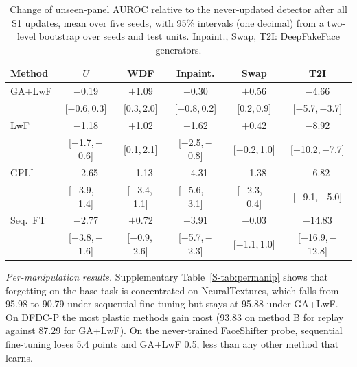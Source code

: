 \documentclass[journal]{IEEEtran}
\begin{document}
\begin{table}[t]
\caption{Change of unseen-panel AUROC relative to the never-updated detector after all S1 updates, mean over five seeds, with 95\% intervals (one decimal) from a two-level bootstrap over seeds and test units. Inpaint., Swap, T2I: DeepFakeFace generators.}
\label{tab:retention}
\centering
\footnotesize
\setlength{\tabcolsep}{0.9pt}
\begin{tabular}{@{}lccccc@{}}
\toprule
Method & $U$ & WDF & Inpaint. & Swap & T2I \\
\midrule
GA+LwF & $-$0.19 & $+$1.09 & $-$0.30 & $+$0.56 & $-$4.66 \\
 & {\scriptsize[$-$0.6,\,0.3]} & {\scriptsize[0.3,\,2.0]} & {\scriptsize[$-$0.8,\,0.2]} & {\scriptsize[0.2,\,0.9]} & {\scriptsize[$-$5.7,\,$-$3.7]} \\[1pt]
LwF & $-$1.18 & $+$1.02 & $-$1.62 & $+$0.42 & $-$8.92 \\
 & {\scriptsize[$-$1.7,\,$-$0.6]} & {\scriptsize[0.1,\,2.1]} & {\scriptsize[$-$2.5,\,$-$0.8]} & {\scriptsize[$-$0.2,\,1.0]} & {\scriptsize[$-$10.2,\,$-$7.7]} \\[1pt]
GPL$^\dagger$ & $-$2.65 & $-$1.13 & $-$4.31 & $-$1.38 & $-$6.82 \\
 & {\scriptsize[$-$3.9,\,$-$1.4]} & {\scriptsize[$-$3.4,\,1.1]} & {\scriptsize[$-$5.6,\,$-$3.1]} & {\scriptsize[$-$2.3,\,$-$0.4]} & {\scriptsize[$-$9.1,\,$-$5.0]} \\[1pt]
Seq.\ FT & $-$2.77 & $+$0.72 & $-$3.91 & $-$0.03 & $-$14.83 \\
 & {\scriptsize[$-$3.8,\,$-$1.6]} & {\scriptsize[$-$0.9,\,2.6]} & {\scriptsize[$-$5.7,\,$-$2.3]} & {\scriptsize[$-$1.1,\,1.0]} & {\scriptsize[$-$16.9,\,$-$12.8]} \\[1pt]
\bottomrule
\end{tabular}
\end{table}

\textit{Per-manipulation results.} Supplementary Table~\ref{S-tab:permanip} shows that forgetting on the base task is concentrated on NeuralTextures, which falls from 95.98 to 90.79 under sequential fine-tuning but stays at 95.88 under GA+LwF. On DFDC-P the most plastic methods gain most (93.83 on method B for replay against 87.29 for GA+LwF). On the never-trained FaceShifter probe, sequential fine-tuning loses 5.4 points and GA+LwF 0.5, less than any other method that learns.
\end{document}
